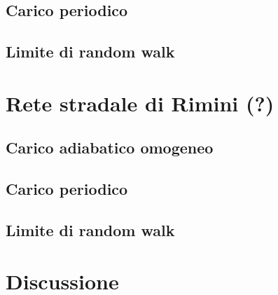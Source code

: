 \documentclass[../main.tex]{subfiles}
\begin{document}
\subsection{Carico periodico}

\subsection{Limite di random walk}

\section{Rete stradale di Rimini (?)}

\subsection{Carico adiabatico omogeneo}

\subsection{Carico periodico}

\subsection{Limite di random walk}

\section{Discussione}


\end{document}

